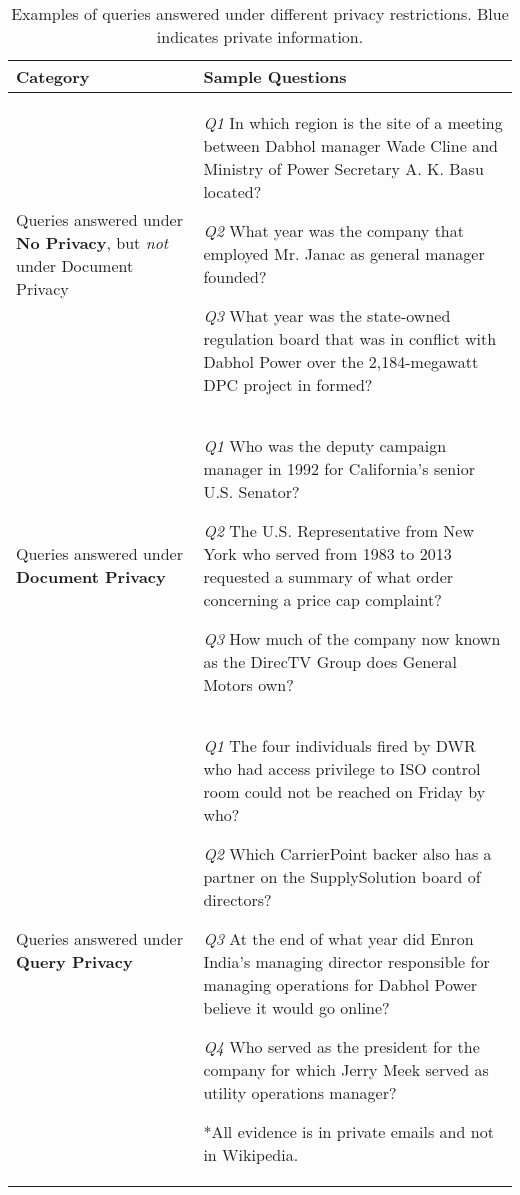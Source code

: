 \documentclass{article}
\newcommand{\blue}[1]{{\color{blue}#1}}
\begin{document}
\begin{table*}[t]
\small
\begin{tabular}{p{2.7cm}p{12.7cm}}
\toprule
Category & Sample Questions  \\
\midrule
Queries answered 
under \textbf{No Privacy}, but \textit{not} under Document Privacy & \textit{Q1} In which region is the \blue{site of a meeting} between Dabhol manager Wade Cline and Ministry of Power Secretary A. K. Basu located? 

\textit{Q2} What year was the \blue{company that employed Mr. Janac} as general manager founded?

\textit{Q3} What year was the state-owned regulation \blue{board that was in conflict} with Dabhol Power over the 2,184-megawatt DPC project in formed?\\
\midrule
Queries answered under \textbf{Document Privacy} & 
\textit{Q1}  Who was the \blue{deputy campaign manager} in 1992 for California's senior U.S. Senator?

\textit{Q2} The U.S. Representative from New York who served from 1983 to 2013 requested a summary of what \blue{order concerning a price cap complaint}?

\textit{Q3} \blue{How much of the company} now known as the DirecTV Group does General Motors own?
\\
\midrule
Queries answered under \textbf{Query Privacy} \newline\newline  & 
\textit{Q1} The four individuals fired by DWR who had access privilege to ISO control room could not be reached on Friday by who? 

\textit{Q2}  Which CarrierPoint backer also has a partner on the SupplySolution board of directors?

\textit{Q3} At the end of what year did Enron India's managing director responsible for managing operations for Dabhol Power believe it would go online?

\textit{Q4} Who served as the president for the company for which Jerry Meek served as utility operations manager?

\blue{*All evidence is in private emails and not in  Wikipedia.}\\
\bottomrule
\end{tabular}
\caption{Examples of queries answered under different privacy restrictions. \blue{Blue} indicates private information.}
    \vspace{3mm}
    \label{tab:answerable_questions}
\end{table*}
\end{document}
